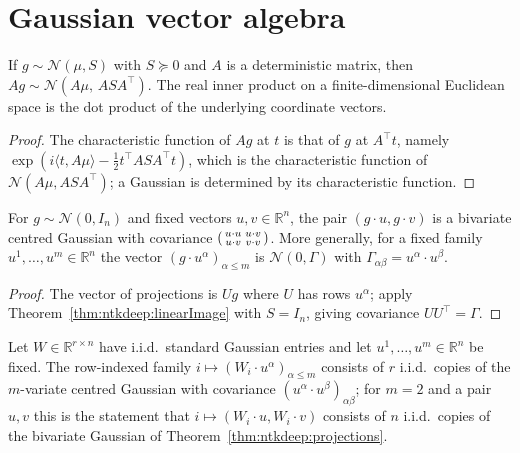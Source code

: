 \section{Gaussian vector algebra}\label{sec:ntkdeep:gaussianAlgebra}

\begin{theorem}\label{thm:ntkdeep:linearImage}
  \leanok
If $g\sim\mathcal N(\mu,S)$ with $S\succeq0$ and $A$ is a deterministic matrix, then $Ag\sim\mathcal N(A\mu,\,ASA^\top)$. The real inner product on a finite-dimensional Euclidean space is the dot product of the underlying coordinate vectors.
\end{theorem}

\begin{proof}
  \leanok
The characteristic function of $Ag$ at $t$ is that of $g$ at $A^\top t$, namely $\exp(i\langle t,A\mu\rangle-\tfrac12t^\top ASA^\top t)$, which is the characteristic function of $\mathcal N(A\mu,ASA^\top)$; a Gaussian is determined by its characteristic function.
\end{proof}

\begin{theorem}\label{thm:ntkdeep:projections}
  \leanok
For $g\sim\mathcal N(0,I_n)$ and fixed vectors $u,v\in\mathbb R^n$, the pair $(g\cdot u,g\cdot v)$ is a bivariate centred Gaussian with covariance $\begin{psmallmatrix}u\cdot u&u\cdot v\\u\cdot v&v\cdot v\end{psmallmatrix}$.
More generally, for a fixed family $u^1,\dots,u^m\in\mathbb R^n$ the vector $(g\cdot u^\alpha)_{\alpha\le m}$ is $\mathcal N(0,\Gamma)$ with $\Gamma_{\alpha\beta}=u^\alpha\cdot u^\beta$.
\end{theorem}

\begin{proof}
  \leanok
The vector of projections is $Ug$ where $U$ has rows $u^\alpha$; apply Theorem~\ref{thm:ntkdeep:linearImage} with $S=I_n$, giving covariance $UU^\top=\Gamma$.
\end{proof}

\begin{theorem}\label{thm:ntkdeep:gaussianMatrix}
  \leanok
Let $W\in\mathbb R^{r\times n}$ have i.i.d.\ standard Gaussian entries and let $u^1,\dots,u^m\in\mathbb R^n$ be fixed. The row-indexed family $i\mapsto(W_i\cdot u^\alpha)_{\alpha\le m}$ consists of $r$ i.i.d.\ copies of the $m$-variate centred Gaussian with covariance $(u^\alpha\cdot u^\beta)_{\alpha\beta}$; for $m=2$ and a pair $u,v$ this is
the statement that $i\mapsto(W_i\cdot u,W_i\cdot v)$ consists of $n$ i.i.d.\ copies of the bivariate Gaussian of Theorem~\ref{thm:ntkdeep:projections}.
\end{theorem}


